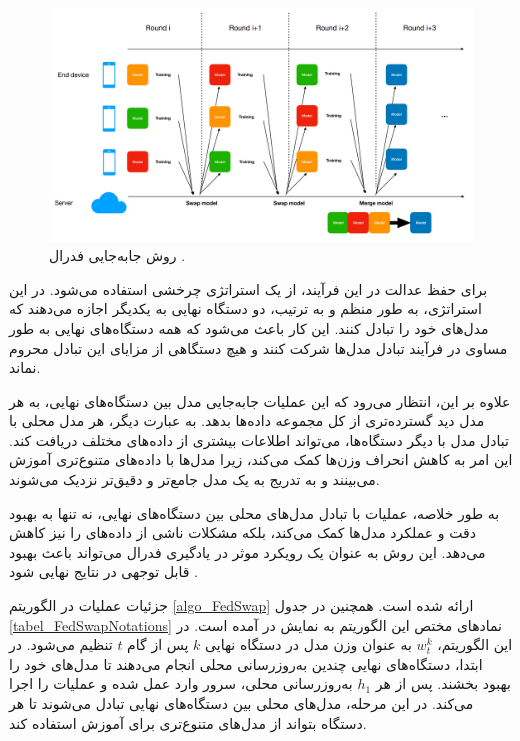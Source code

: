 \begin{figure}[b!]
	\centering
	\includegraphics[scale=0.2]{images/chap4/federated_swapping.png}%
	\caption{%
		روش جابه‌جایی فدرال
		\cite{chiu2020semisupervised}%
		.
	}
	\label{federated_swapping}
	\centering
\end{figure}


برای حفظ عدالت در این فرآیند، از یک استراتژی چرخشی استفاده می‌شود. در این استراتژی، به طور منظم و به ترتیب، دو دستگاه نهایی به یکدیگر اجازه می‌دهند که مدل‌های خود را تبادل کنند. این کار باعث می‌شود که همه دستگاه‌های نهایی به طور مساوی در فرآیند تبادل مدل‌ها شرکت کنند و هیچ دستگاهی از مزایای این تبادل محروم نماند.

علاوه بر این، انتظار می‌رود که این عملیات جابه‌جایی مدل بین دستگاه‌های نهایی، به هر مدل دید گسترده‌تری از کل مجموعه داده‌ها بدهد. به عبارت دیگر، هر مدل محلی با تبادل مدل با دیگر دستگاه‌ها، می‌تواند اطلاعات بیشتری از داده‌های مختلف دریافت کند. این امر به کاهش انحراف وزن‌ها کمک می‌کند، زیرا مدل‌ها با داده‌های متنوع‌تری آموزش می‌بینند و به تدریج به یک مدل جامع‌تر و دقیق‌تر نزدیک می‌شوند.

به طور خلاصه، عملیات
با تبادل مدل‌های محلی بین دستگاه‌های نهایی، نه تنها به بهبود دقت و عملکرد مدل‌ها کمک می‌کند، بلکه مشکلات ناشی از داده‌های
را نیز کاهش می‌دهد. این روش به عنوان یک رویکرد موثر در یادگیری فدرال می‌تواند باعث بهبود قابل توجهی در نتایج نهایی شود
\cite{chiu2020semisupervised}.


جزئیات عملیات
در الگوریتم
\ref{algo_FedSwap}
ارائه شده است.
همچنین در جدول
\ref{tabel_FedSwapNotations}
نمادهای مختص این الگوریتم به نمایش در آمده است.
در این الگوریتم،
$w^k_t$
به عنوان وزن مدل در دستگاه نهایی
$k$
پس از گام
$t$
تنظیم می‌شود. در ابتدا، دستگاه‌های نهایی چندین به‌روزرسانی محلی انجام می‌دهند تا مدل‌های خود را بهبود بخشند. پس از هر
$h_1$
به‌روزرسانی محلی، سرور وارد عمل شده و عملیات
را اجرا می‌کند. در این مرحله، مدل‌های محلی بین دستگاه‌های نهایی تبادل می‌شوند تا هر دستگاه بتواند از مدل‌های متنوع‌تری برای آموزش استفاده کند.

